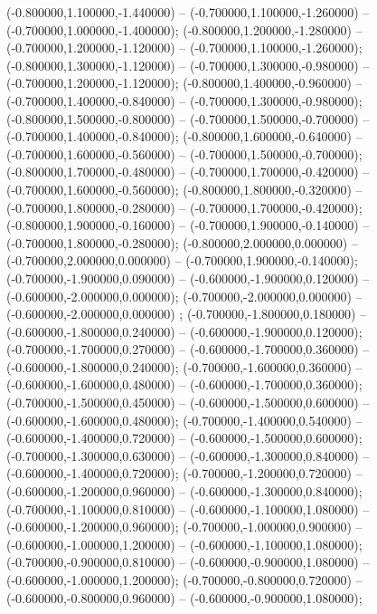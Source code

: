  (-0.800000,1.100000,-1.440000) -- (-0.700000,1.100000,-1.260000) -- (-0.700000,1.000000,-1.400000);
 (-0.800000,1.200000,-1.280000) -- (-0.700000,1.200000,-1.120000) -- (-0.700000,1.100000,-1.260000);
 (-0.800000,1.300000,-1.120000) -- (-0.700000,1.300000,-0.980000) -- (-0.700000,1.200000,-1.120000);
 (-0.800000,1.400000,-0.960000) -- (-0.700000,1.400000,-0.840000) -- (-0.700000,1.300000,-0.980000);
 (-0.800000,1.500000,-0.800000) -- (-0.700000,1.500000,-0.700000) -- (-0.700000,1.400000,-0.840000);
 (-0.800000,1.600000,-0.640000) -- (-0.700000,1.600000,-0.560000) -- (-0.700000,1.500000,-0.700000);
 (-0.800000,1.700000,-0.480000) -- (-0.700000,1.700000,-0.420000) -- (-0.700000,1.600000,-0.560000);
 (-0.800000,1.800000,-0.320000) -- (-0.700000,1.800000,-0.280000) -- (-0.700000,1.700000,-0.420000);
 (-0.800000,1.900000,-0.160000) -- (-0.700000,1.900000,-0.140000) -- (-0.700000,1.800000,-0.280000);
 (-0.800000,2.000000,0.000000) -- (-0.700000,2.000000,0.000000) -- (-0.700000,1.900000,-0.140000);
 (-0.700000,-1.900000,0.090000) -- (-0.600000,-1.900000,0.120000) -- (-0.600000,-2.000000,0.000000);
 (-0.700000,-2.000000,0.000000) -- (-0.600000,-2.000000,0.000000) ;
 (-0.700000,-1.800000,0.180000) -- (-0.600000,-1.800000,0.240000) -- (-0.600000,-1.900000,0.120000);
 (-0.700000,-1.700000,0.270000) -- (-0.600000,-1.700000,0.360000) -- (-0.600000,-1.800000,0.240000);
 (-0.700000,-1.600000,0.360000) -- (-0.600000,-1.600000,0.480000) -- (-0.600000,-1.700000,0.360000);
 (-0.700000,-1.500000,0.450000) -- (-0.600000,-1.500000,0.600000) -- (-0.600000,-1.600000,0.480000);
 (-0.700000,-1.400000,0.540000) -- (-0.600000,-1.400000,0.720000) -- (-0.600000,-1.500000,0.600000);
 (-0.700000,-1.300000,0.630000) -- (-0.600000,-1.300000,0.840000) -- (-0.600000,-1.400000,0.720000);
 (-0.700000,-1.200000,0.720000) -- (-0.600000,-1.200000,0.960000) -- (-0.600000,-1.300000,0.840000);
 (-0.700000,-1.100000,0.810000) -- (-0.600000,-1.100000,1.080000) -- (-0.600000,-1.200000,0.960000);
 (-0.700000,-1.000000,0.900000) -- (-0.600000,-1.000000,1.200000) -- (-0.600000,-1.100000,1.080000);
 (-0.700000,-0.900000,0.810000) -- (-0.600000,-0.900000,1.080000) -- (-0.600000,-1.000000,1.200000);
 (-0.700000,-0.800000,0.720000) -- (-0.600000,-0.800000,0.960000) -- (-0.600000,-0.900000,1.080000);
